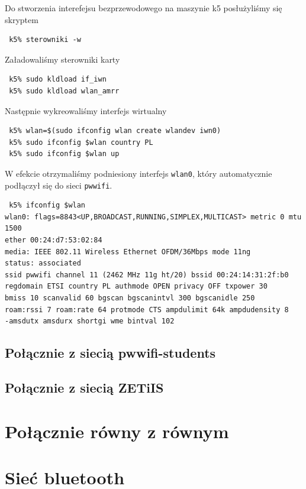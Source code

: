 \documentclass[a4paper,11pt,notitlepage]{article}
\begin{document}
Do stworzenia interefejsu bezprzewodowego na maszynie k5 posłużyliśmy się skryptem 
\begin{verbatim}
 k5% sterowniki -w
\end{verbatim}
Załadowaliśmy sterowniki karty 
\begin{verbatim}
 k5% sudo kldload if_iwn
 k5% sudo kldload wlan_amrr
\end{verbatim}
Następnie wykreowaliśmy interfejs wirtualny
\begin{verbatim}
 k5% wlan=$(sudo ifconfig wlan create wlandev iwn0)
 k5% sudo ifconfig $wlan country PL
 k5% sudo ifconfig $wlan up
\end{verbatim}
W efekcie otrzymaliśmy podniesiony interfejs \verb+wlan0+, który automatycznie podłączył się do sieci \verb+pwwifi+.
\begin{verbatim}
 k5% ifconfig $wlan
wlan0: flags=8843<UP,BROADCAST,RUNNING,SIMPLEX,MULTICAST> metric 0 mtu 1500
ether 00:24:d7:53:02:84
media: IEEE 802.11 Wireless Ethernet OFDM/36Mbps mode 11ng
status: associated
ssid pwwifi channel 11 (2462 MHz 11g ht/20) bssid 00:24:14:31:2f:b0
regdomain ETSI country PL authmode OPEN privacy OFF txpower 30
bmiss 10 scanvalid 60 bgscan bgscanintvl 300 bgscanidle 250
roam:rssi 7 roam:rate 64 protmode CTS ampdulimit 64k ampdudensity 8
-amsdutx amsdurx shortgi wme bintval 102
\end{verbatim}


\subsection{Połącznie z siecią pwwifi-students}

\subsection{Połącznie z siecią ZETiIS}

\section{Połącznie równy z równym}

\section{Sieć bluetooth} 
\end{document}

